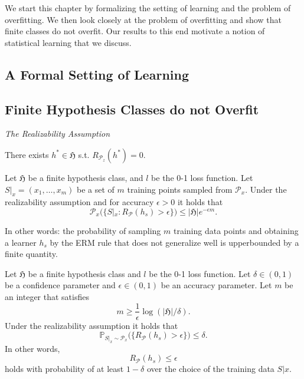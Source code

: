 We start this chapter by formalizing the setting of learning and the problem of
overfitting. We then look closely at the problem of overfitting and show that
finite classes do not overfit. Our results to this end motivate a notion of
statistical learning that we discuss.

\subsection{A Formal Setting of Learning}

\subsection{Finite Hypothesis Classes do not Overfit}

\centering \emph{The Realizability Assumption}

	There exists $h^* \in \mathfrak{H}$ s.t. $R_{\mathcal{P}_z}(h^*) = 0$.

    \begin{lemma}
		Let $\mathfrak{H}$ be a finite hypothesis class, and $l$ be the 0-1 loss
		function. Let $S|_x = (x_1, \dots, x_m)$ be a set of $m$ training points
		sampled from $\mathcal{P}_x$. Under the realizability assumption and
		for accuracy $\epsilon >0$ it holds that 
		$$
		\mathcal{P}_x\bigl(\{S|_x: R_\mathcal{P}(h_s) > \epsilon\} \bigr) \leq |\mathfrak{H}| e ^{-\epsilon m}.
		$$
	\end{lemma}
	In other words: the probability of sampling $m$ training data points and
	obtaining a learner $h_s$ by the ERM rule that does not generalize well is
	upperbounded by a finite quantity.

    \begin{coro}
		\label{Coro:finite_hypo}
		Let $\mathfrak{H}$ be a finite hypothesis class and $l$ be the 0-1 loss
		function. Let $\delta \in (0,1)$ be a confidence parameter and $\epsilon \in
		(0,1)$ be an accuracy parameter. Let $m$ be an integer that satisfies
		$$
		m \geq \frac{1}{\epsilon} \log(|\mathfrak{H}|/\delta).
		$$ 	
		Under the realizability assumption it holds that 
		$$
		\mathbb{P}_{S|_x \sim \mathcal{P}_x} \bigl( \{ R_\mathcal{P}(h_s) > \epsilon \}\bigr) \leq \delta.
		$$
		In other words, 
		$$
		R_\mathcal{P}(h_s) \leq \epsilon
		$$
		holds with probability of at least $1-\delta$ over the choice of the
		training data $S|x$.
	\end{coro}
